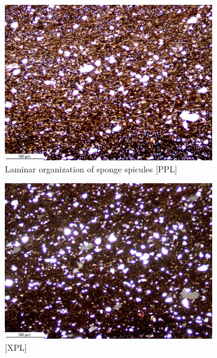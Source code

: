 \documentclass[a4paper]{article}
\begin{document}
\begin{figure}[H]
	\centering
	\begin{subfigure}[t]{.49\textwidth}
		\includegraphics[width=\textwidth]{ThinSections/101-2_4x_PPL.jpg}
		\caption{Laminar organization of sponge spicules [PPL]}
	\end{subfigure}\hspace{.5em}\hfill
	\begin{subfigure}[t]{.49\textwidth}
		\includegraphics[width=\textwidth]{ThinSections/101-2_4x_XPL.jpg}
		\caption{[XPL]}
	\end{subfigure}
	\begin{subfigure}[t]{.49\textwidth}

\end{subfigure}
\end{figure}
\end{document}
